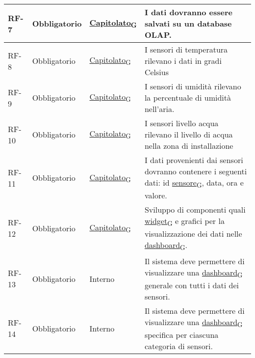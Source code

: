 \begin{longtable}{|>{\centering\arraybackslash}m{}|>{\centering\arraybackslash}m{}|>{\centering\arraybackslash}m{}|>{\centering\arraybackslash}m{}|}
	\\\hline
	RF-7            & Obbligatorio        & \href{https://7last.github.io/docs/rtb/documentazione-interna/glossario\#capitolato}{Capitolato\textsubscript{G}}     & I dati dovranno essere salvati su un database OLAP.
	\\\hline
	RF-8            & Obbligatorio        & \href{https://7last.github.io/docs/rtb/documentazione-interna/glossario\#capitolato}{Capitolato\textsubscript{G}}     & I sensori di temperatura rilevano i dati in gradi Celsius
	\\\hline
	RF-9            & Obbligatorio        & \href{https://7last.github.io/docs/rtb/documentazione-interna/glossario\#capitolato}{Capitolato\textsubscript{G}}     & I sensori di umidità rilevano la percentuale di umidità nell’aria.
	\\\hline
	RF-10           & Obbligatorio        & \href{https://7last.github.io/docs/rtb/documentazione-interna/glossario\#capitolato}{Capitolato\textsubscript{G}}     & I sensori livello acqua rilevano il livello di acqua nella zona di installazione
	\\\hline
	RF-11           & Obbligatorio        & \href{https://7last.github.io/docs/rtb/documentazione-interna/glossario\#capitolato}{Capitolato\textsubscript{G}}     & I dati provenienti dai sensori dovranno contenere i seguenti dati: id \href{https://7last.github.io/docs/rtb/documentazione-interna/glossario\#sensore}{sensore\textsubscript{G}}, data, ora e valore.
	\\\hline
	RF-12           & Obbligatorio        & \href{https://7last.github.io/docs/rtb/documentazione-interna/glossario\#capitolato}{Capitolato\textsubscript{G}}     & Sviluppo di componenti quali \href{https://7last.github.io/docs/rtb/documentazione-interna/glossario\#widget}{widget\textsubscript{G}} e grafici per la visualizzazione dei dati nelle \href{https://7last.github.io/docs/rtb/documentazione-interna/glossario\#dashboard}{dashboard\textsubscript{G}}.
	\\\hline
	RF-13           & Obbligatorio        & Interno        & Il sistema deve permettere di visualizzare una \href{https://7last.github.io/docs/rtb/documentazione-interna/glossario\#dashboard}{dashboard\textsubscript{G}} generale con tutti i dati dei sensori.
	\\\hline
	RF-14           & Obbligatorio        & Interno        & Il sistema deve permettere di visualizzare una \href{https://7last.github.io/docs/rtb/documentazione-interna/glossario\#dashboard}{dashboard\textsubscript{G}} specifica per ciascuna categoria di sensori.

\end{longtable}
